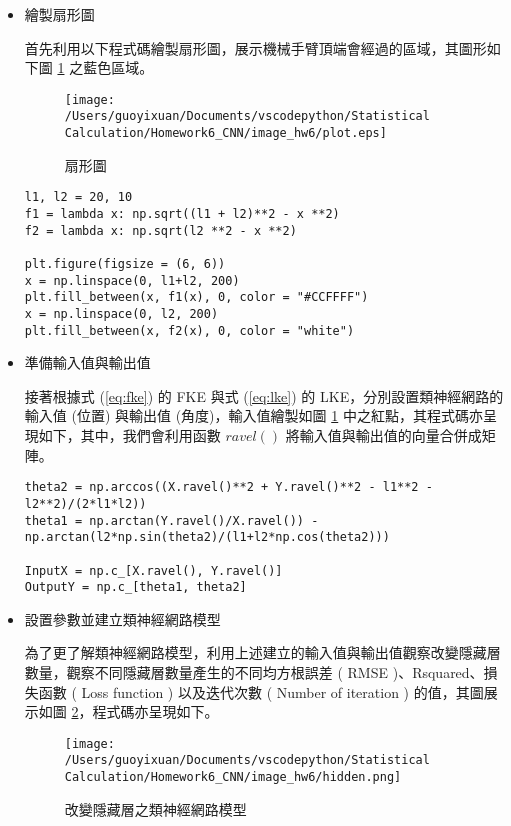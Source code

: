 \begin{itemize}
\item{} 繪製扇形圖

首先利用以下程式碼繪製扇形圖，展示機械手臂頂端會經過的區域，其圖形如下圖 \ref{fig:plot} 之藍色區域。

\begin{figure}[H]
    \centering
        \texttt{[image: /Users/guoyixuan/Documents/vscodepython/Statistical Calculation/Homework6\_CNN/image\_hw6/plot.eps]}
    \caption{扇形圖}
    \label{fig:plot}
\end{figure}

\begin{lstlisting}
l1, l2 = 20, 10
f1 = lambda x: np.sqrt((l1 + l2)**2 - x **2)
f2 = lambda x: np.sqrt(l2 **2 - x **2)

plt.figure(figsize = (6, 6))
x = np.linspace(0, l1+l2, 200)
plt.fill_between(x, f1(x), 0, color = "#CCFFFF")
x = np.linspace(0, l2, 200)
plt.fill_between(x, f2(x), 0, color = "white")
\end{lstlisting}

\item{} 準備輸入值與輸出值

接著根據式 (\ref{eq:fke}) 的 FKE 與式 (\ref{eq:lke}) 的 LKE，分別設置類神經網路的輸入值 (位置) 與輸出值 (角度)，輸入值繪製如圖 \ref{fig:plot} 中之紅點，其程式碼亦呈現如下，其中，我們會利用函數 $ravel()$ 將輸入值與輸出值的向量合併成矩陣。

\bigskip
\begin{lstlisting}
theta2 = np.arccos((X.ravel()**2 + Y.ravel()**2 - l1**2 - l2**2)/(2*l1*l2))
theta1 = np.arctan(Y.ravel()/X.ravel()) - np.arctan(l2*np.sin(theta2)/(l1+l2*np.cos(theta2)))

InputX = np.c_[X.ravel(), Y.ravel()] 
OutputY = np.c_[theta1, theta2]
\end{lstlisting}


\item{} 設置參數並建立類神經網路模型

為了更了解類神經網路模型，利用上述建立的輸入值與輸出值觀察改變隱藏層數量，觀察不同隱藏層數量產生的不同均方根誤差 ( RMSE )、Rsquared、損失函數 ( Loss function ) 以及迭代次數 ( Number of iteration ) 的值，其圖展示如圖 \ref{fig:hidden}，程式碼亦呈現如下。

\begin{figure}[H]
    \centering
        \texttt{[image: /Users/guoyixuan/Documents/vscodepython/Statistical Calculation/Homework6\_CNN/image\_hw6/hidden.png]}
    \caption{改變隱藏層之類神經網路模型}
    \label{fig:hidden}
\end{figure}


\end{itemize}
